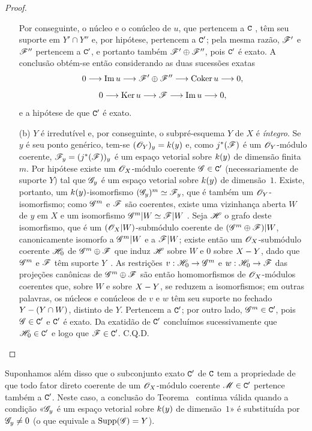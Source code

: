 \begin{proof}
\begin{enumerate}
    Por conseguinte, o núcleo e o conúcleo de $u$, que pertencem a $\C$ , têm seu suporte em $Y'\cap Y''$ e, por hipótese, pertencem a $\C'$; pela mesma razão, $\sh{F}'$ e $\sh{F}''$ pertencem a $\C'$, e portanto também $\sh{F}'\oplus\sh{F}''$, pois $\C'$ é exato.
    A conclusão obtém-se então considerando as duas sucessões exatas
    \[
      0\to\Im u\to\sh{F}'\oplus\sh{F}''\to\Coker u\to 0,
    \]
    \[
      0\to\Ker u\to\sh{F}\to\Im u\to 0,
    \]
    e a hipótese de que $\C'$ é exato.
  \item[(b)] $Y$ é irredutível e, por conseguinte, o subpré-esquema $Y$ de $X$ é \emph{íntegro}.
    Se $y$ é seu ponto genérico, tem-se $(\mathscr{O}_Y)_y=k(y)$ e, como $j^*(\mathscr{F})$ é um $\mathscr{O}_Y$-módulo coerente, $\mathscr{F}_y=(j^*(\mathscr{F}))_y$ é um espaço vetorial sobre $k(y)$ de dimensão finita~$m$.
    Por hipótese existe um $\mathscr{O}_X$-módulo coerente $\mathscr{G}\in\mathtt{C}'$ (necessariamente de suporte $Y$) tal que $\mathscr{G}_y$ é um espaço vetorial sobre $k(y)$ de dimensão~$1$.
    Existe, portanto, um $k(y)$-isomorfismo $(\mathscr{G}_y)^m\simeq\mathscr{F}_y$, que é também um $\mathscr{O}_Y$-isomorfismo; como $\mathscr{G}^m$ e $\mathscr{F}$ são coerentes, existe uma vizinhança aberta $W$ de $y$ em $X$ e um isomorfismo $\mathscr{G}^m|W\simeq\mathscr{F}|W$ .
    Seja $\mathscr{H}$ o grafo deste isomorfismo, que é um $(\mathscr{O}_X|W)$-submódulo coerente de $(\mathscr{G}^m\oplus\mathscr{F})|W$, canonicamente isomorfo a $\mathscr{G}^m|W$ e a $\mathscr{F}|W$; existe então um $\mathscr{O}_X$-submódulo coerente $\mathscr{H}_0$ de $\mathscr{G}^m\oplus\mathscr{F}$ que induz $\mathscr{H}$ sobre $W$ e $0$ sobre $X- Y$, dado que $\mathscr{G}^m$ e $\mathscr{F}$ têm suporte $Y$~.
    As restrições $v:\sh{H}_0\to\sh{G}^m$ e $w:\sh{H}_0\to\sh{F}$ das projeções canônicas de $\mathscr{G}^m\oplus\mathscr{F}$ são então homomorfismos de $\mathscr{O}_X$-módulos coerentes que, sobre $W$ e sobre $X- Y$, se reduzem a isomorfismos; em outras palavras, os núcleos e conúcleos de $v$ e $w$ têm seu suporte no fechado $Y-(Y\cap W)$, distinto de $Y$.
    Pertencem a $\C'$; por outro lado, $\mathscr{G}^m\in\mathtt{C}'$, pois $\mathscr{G}\in\mathtt{C}'$ e $\C'$ é exato.
    Da exatidão de $\C'$ concluímos sucessivamente que $\mathscr{H}_0\in\mathtt{C}'$ e logo que $\mathscr{F}\in\mathtt{C}'$.
C.Q.D.
\end{enumerate}
\end{proof}

\begin{corollary}[3.1.3]
\label{III.3.1.3}
Suponhamos além disso que o subconjunto exato $\C'$ de $\C$ tem a propriedade de que todo fator direto coerente de um $\mathscr{O}_X$-módulo coerente $\mathscr{M}\in\mathtt{C}'$ pertence também a $\C'$.
Neste caso, a conclusão do Teorema~ continua válida quando a condição «$\mathscr{G}_y$ é um espaço vetorial sobre $k(y)$ de dimensão~$1$» é substituída por $\mathscr{G}_y\neq 0$ (o que equivale a $\operatorname{Supp}(\mathscr{G})=Y$).
\end{corollary}

